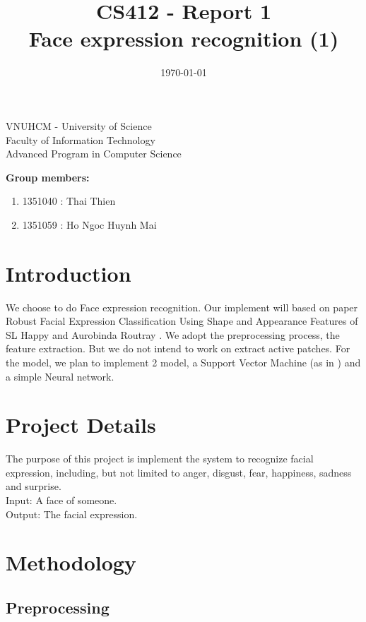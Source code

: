\documentclass[a4paper, 12pt]{article}
\title{CS412 - Report 1\\ Face expression recognition (1)}
\date{\today}
\begin{document}
\begin{center} 
\large VNUHCM - University of Science\\
Faculty of Information Technology\\
Advanced Program in Computer Science
\end{center}

\begingroup
\let\newpage\relax
\maketitle
\endgroup

\textbf{Group members:}
\begin{enumerate}
	\item 1351040 : Thai Thien
	\item 1351059 : Ho Ngoc Huynh Mai
\end{enumerate}

\section{Introduction}

We choose to do Face expression recognition. Our implement will based on paper Robust Facial Expression Classification Using Shape and Appearance Features of SL Happy and Aurobinda Routray \cite{7050661}. We adopt the preprocessing process, the feature extraction. But we do not intend to work on extract active patches. For the model, we plan to implement 2 model, a Support Vector Machine (as in \cite{7050661}) and a simple Neural network.      

\section{Project Details}
The purpose of this project is implement the system to recognize facial expression, including, but not limited to anger, disgust, fear, happiness, sadness and surprise. \\
Input: A face of someone. \\
Output: The facial expression. \\ 

\section{Methodology}

\subsection{Preprocessing}
\end{document}
